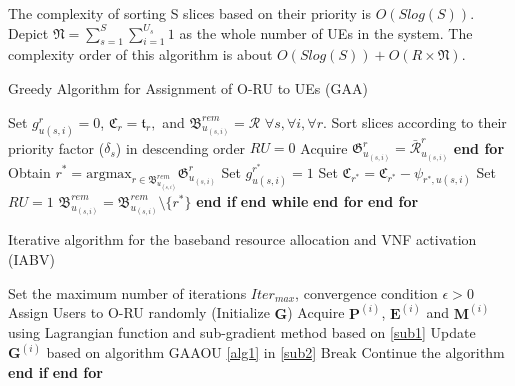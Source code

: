 \documentclass[lettersize,journal]{IEEEtran}
\begin{document}
The complexity of sorting S slices based on their priority is $O(Slog(S))$.
Depict $\mathfrak{N} =  \sum_{s=1}^S\sum_{i=1}^{U_s} 1$ as the whole number of UEs in the system.
The complexity order of this algorithm is about $O(Slog(S)) + O(R\times \mathfrak{N})$.
\begin{algorithm}
\small
\caption{Greedy Algorithm for Assignment of O-RU to UEs (GAA)}\label{alg1}
\begin{algorithmic}[1]
\State Set $g^r_{u(s,i)} = 0$, $\mathfrak{C}_r = \mathfrak{t}_r,$ and ${\mathfrak{B}}^{rem}_{u_{(s,i)}} = \mathcal{R}$   $\forall s, \forall i, \forall r$.\label{31}
\State Sort slices according to their priority factor ($\delta_s$) in descending order
\label{33}
\State $RU = 0$
\State Acquire $\mathfrak{G}^r_{u_{(s,i)}} = \bar{\mathcal{R}}^r_{u_{(s,i)}}$
\EndFor
\State \textbf{end for}
\State Obtain $r^* = \text{argmax}_{r\in{\mathfrak{B}}^{rem}_{u_{(s,i)}}} \mathfrak{G}^r_{u_{(s,i)}}$
\State Set $g^{r^*}_{u(s,i)} = 1$
\State Set  $\mathfrak{C}_{r^*} = \mathfrak{C}_{r^*} - \psi_{{r^*},u(s,i)}$
\State Set $RU = 1$
\Else
\State  ${\mathfrak{B}}^{rem}_{u_{(s,i)}} = {\mathfrak{B}}^{rem}_{u_{(s,i)}} \setminus \{{r^*}\} $
\EndIf
\State \textbf{end if}
\EndWhile
\State \textbf{end while}
\EndFor
\State \textbf{end for}
\EndFor
\State \textbf{end for} \label{34}
\end{algorithmic}
\end{algorithm}

 \begin{algorithm}
 \small
\caption{Iterative algorithm for the baseband resource allocation and VNF activation (IABV)}\label{alg2}
\begin{algorithmic}[1]
\State  Set the maximum number of iterations ${Iter}_{max}$, convergence condition $\epsilon > 0$ \label{a21}
\State  Assign Users to O-RU randomly (Initialize $\boldsymbol{G}$) \label{a22}
\label{23}
\State Acquire $\boldsymbol{P}^{(i)}$, $\boldsymbol{E}^{(i)}$ and $\boldsymbol{M}^{(i)}$ using Lagrangian function and sub-gradient method based on \eqref{sub1}
\State Update $\boldsymbol{G}^{(i)}$   based on algorithm GAAOU \eqref{alg1} in  \eqref{sub2}
\State Break
\Else
\State Continue the algorithm
\EndIf
\State \textbf{end if}
\EndFor
\State \textbf{end for} \label{24}
\end{algorithmic}
\end{algorithm}
\end{document}
